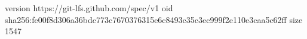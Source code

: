version https://git-lfs.github.com/spec/v1
oid sha256:fe00f8d306a36bdc773c7670376315e6c8493c35c3ec999f2e110e3caa5c62ff
size 1547

